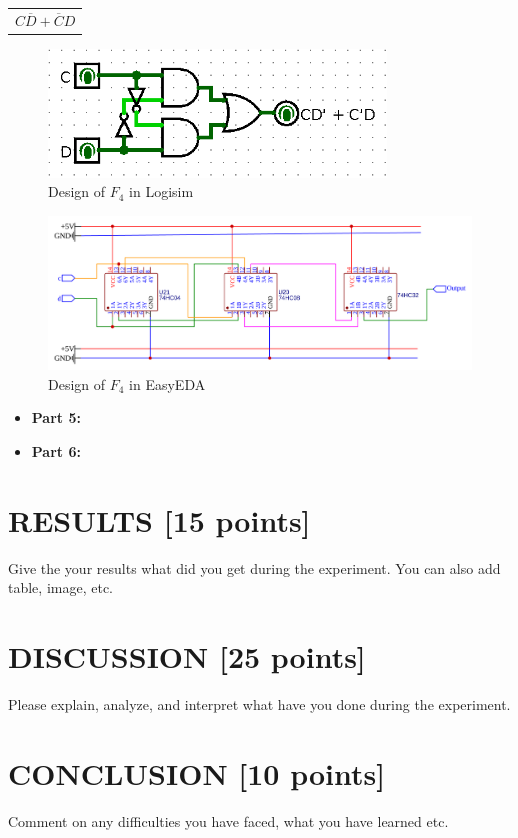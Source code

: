 \documentclass[pdftex,12pt,a4paper]{article}
\begin{document}
\begin{itemize}
\begin{center}
\begin{tabular}{c}
     $ C\overline{D} + \overline{C}D $
  \end{tabular}
\end{center}

\begin{figure}[H]
    \centering
        \includegraphics[width=0.8\textwidth]{Logisim_part_4.png}	
        \caption{Design of \textbf{$F_4$} in Logisim}
   \end{figure}
   
	\begin{figure}[H]
    \centering
        \includegraphics[width=\textwidth]{EasyEDA_part_4.png}	
        \caption{Design of \textbf{$F_4$} in EasyEDA}        
	\end{figure}  

\end{itemize}
\begin{itemize}
    \item \textbf{Part 5:}
\end{itemize}

\begin{itemize}
    \item \textbf{Part 6:}
\end{itemize}
\section{RESULTS [15 points]}
Give the your results what did you get during the experiment. You can also add table, image, etc. 

\section{DISCUSSION [25 points]}
Please explain, analyze, and interpret what have you done during the  experiment. 

\section{CONCLUSION [10 points]}
Comment on any difficulties you have faced, what you have learned etc.

\newpage
{}



\end{document}
